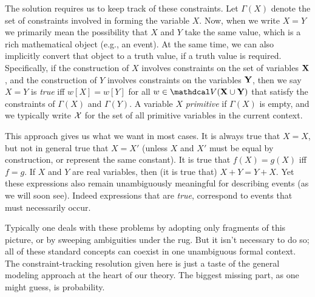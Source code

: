 The solution requires us to keep track of these constraints. 
Let $\Gamma(X)$ denote the set of constraints involved in forming the variable $X$. 
%
Now, when we write $X = Y$ we primarily mean the possibility that $X$ and $Y$ take the same value, which is a rich mathematical object (e.g., an event). 
At the same time, we can also implicitly convert that object to a truth value, if a truth value is required.
Specifically, if the construction of $X$ involves constraints on the set of variables $\mathbf X$, and the construction of $Y$ involves constraints on the variables $\mathbf Y$, 
then we say $X{=}Y$ is \emph{true} iff $w[X] = w[Y]$ for all $w \in \V(\mat X \cup \mat Y)$ that satisfy the constraints of $\Gamma(X)$ and $\Gamma(Y)$.
A variable $X$ \emph{primitive} if $\Gamma(X)$ is empty, and we typically write $\mathcal X$ for the set of all primitive variables in the current context.

This approach gives us what we want in most cases.
It is always true that $X = X$, but not in general true that $X = X'$ (unless $X$ and $X'$ must be equal by construction, or represent the same constant). 
It is true that $f(X) = g(X)$ iff $f = g$.
If $X$ and $Y$ are real variables, then (it is true that) $X + Y = Y + X$.
Yet these expressions also remain unambiguously meaningful for describing events (as we will soon see). 
Indeed expressions that are \emph{true}, correspond to events that must necessarily occur.


Typically one deals with these problems by adopting only fragments of this picture, or by sweeping ambiguities under the rug.
But it isn't necessary to do so; all of these standard concepts can coexist in one unambiguous formal context.
The constraint-tracking resolution given here is just a taste of the general modeling approach at the heart of our theory. 
The biggest missing part, as one might guess, is probability. 

